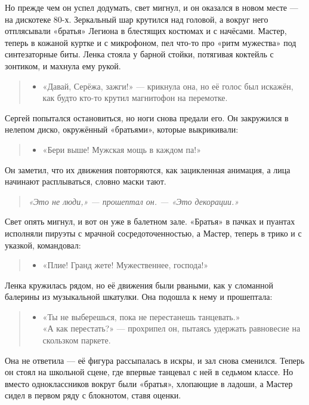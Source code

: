 \documentclass[12pt,a4paper]{book}
\newenvironment{dialogue}{\begin{quote}\itshape\begin{itemize}\item[]}{\end{itemize}\end{quote}}
\newenvironment{innerthought}{\begin{quote}\small\itshape}{\end{quote}}
\begin{document}
Но прежде чем он успел додумать, свет мигнул, и он оказался в новом месте --- на дискотеке 80-х. Зеркальный шар крутился над головой, а вокруг него отплясывали «братья» Легиона в блестящих костюмах и с начёсами. Мастер, теперь в кожаной куртке и с микрофоном, пел что-то про «ритм мужества» под синтезаторные биты. Ленка стояла у барной стойки, потягивая коктейль с зонтиком, и махнула ему рукой.

\begin{dialogue}
«Давай, Серёжа, зажги!» --- крикнула она, но её голос был искажён, как будто кто-то крутил магнитофон на перемотке.
\end{dialogue}

Сергей попытался остановиться, но ноги снова предали его. Он закружился в нелепом диско, окружённый «братьями», которые выкрикивали:

\begin{dialogue}
«Бери выше! Мужская мощь в каждом па!»
\end{dialogue}

Он заметил, что их движения повторяются, как зацикленная анимация, а лица начинают расплываться, словно маски тают.

\begin{innerthought}
«Это не люди,» --- прошептал он. --- «Это декорации.»
\end{innerthought}

Свет опять мигнул, и вот он уже в балетном зале. «Братья» в пачках и пуантах исполняли пируэты с мрачной сосредоточенностью, а Мастер, теперь в трико и с указкой, командовал:

\begin{dialogue}
«Плие! Гранд жете! Мужественнее, господа!»
\end{dialogue}

Ленка кружилась рядом, но её движения были рваными, как у сломанной балерины из музыкальной шкатулки. Она подошла к нему и прошептала:

\begin{dialogue}
«Ты не выберешься, пока не перестанешь танцевать.» \\
«А как перестать?» --- прохрипел он, пытаясь удержать равновесие на скользком паркете.
\end{dialogue}

Она не ответила --- её фигура рассыпалась в искры, и зал снова сменился. Теперь он стоял на школьной сцене, где впервые танцевал с ней в седьмом классе. Но вместо одноклассников вокруг были «братья», хлопающие в ладоши, а Мастер сидел в первом ряду с блокнотом, ставя оценки.
\end{document}

